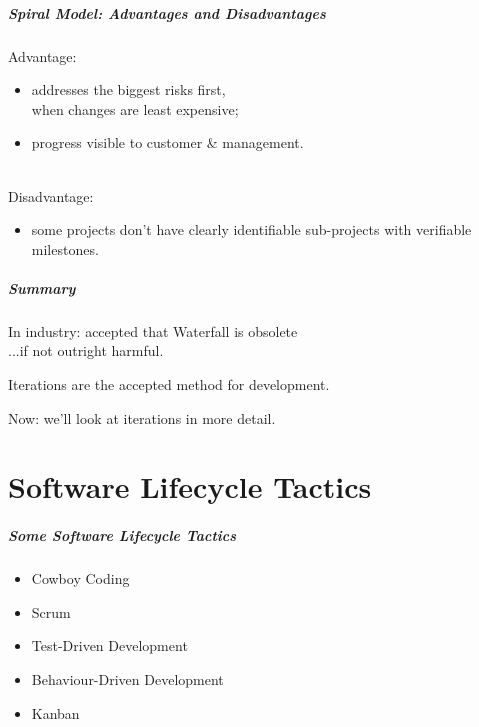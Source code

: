 \begin{frame}
\frametitle{Spiral Model: Advantages and Disadvantages}
\begin{changemargin}{1cm}
Advantage:
\begin{itemize}
\item addresses the biggest risks first, \\
when changes are least expensive; 
\item progress visible to customer \& management.
\end{itemize}
~\\[1em]
Disadvantage:
\begin{itemize}
\item some projects don't have clearly identifiable
sub-projects with verifiable milestones.
\end{itemize}
\end{changemargin}
\end{frame}

\begin{frame}
\frametitle{Summary}
\begin{changemargin}{1cm}

In industry: accepted that Waterfall is obsolete \\
\hfill ...if not outright harmful.

Iterations are the accepted method for development.

Now: we'll look at iterations in more detail.

\end{changemargin}
\end{frame}

\part{Software Lifecycle Tactics}
\frame{\partpage}

\begin{frame}
\frametitle{Some Software Lifecycle Tactics}

\begin{changemargin}{2cm}
\begin{itemize}
\item Cowboy Coding
\item Scrum
\item Test-Driven Development
\item Behaviour-Driven Development
\item Kanban
\end{itemize}
~\\

\end{changemargin}
\end{frame}


